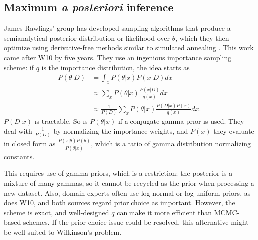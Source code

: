 \documentclass{article}
\begin{document}
\subsection{Maximum \textit{\textbf{ a posteriori}} inference}
James Rawlings' group has developed sampling algorithms that produce a semianalytical posterior distribution or likelihood over $\theta$, which they then optimize using derivative-free methods similar to simulated annealing \cite{gupta2014comparison,srivastava_rawlings2014stoch_opt}.   This work came after W10 by five years. They use an ingenious importance sampling scheme: if $q$ is the importance distribution, the idea starts as
\begin{align*}
P(\theta|D) &= \int_x P(\theta|x)P(x|D) dx\\
&\approx \sum_x P(\theta|x)\frac{P(x|D)}{q(x)} dx\\
&\approx \frac{1}{P(D)}\sum_x P(\theta|x)\frac{P(D|x)P(x)}{q(x)} dx.
\end{align*}
$P(D|x)$ is tractable. So is $P(\theta|x)$ if a conjugate gamma prior is used. They deal with $\frac{1}{P(D)}$ by normalizing the importance weights, and $P(x)$ they evaluate in closed form as $\frac{P(x|\theta)P(\theta)}{P(\theta|x)}$, which is a ratio of gamma distribution normalizing constants. 

This requires use of gamma priors, which is a restriction: the posterior is a mixture of many gammas, so it cannot be recycled as the prior when processing a new dataset. Also, domain experts 
often use log-normal or log-uniform priors, as does W10, and both sources regard prior choice as important. However, the scheme is exact, and well-designed $q$ can make it more efficient than MCMC-based schemes. If the prior choice issue could be resolved, this alternative might be well suited to Wilkinson's problem. 
\end{document}
